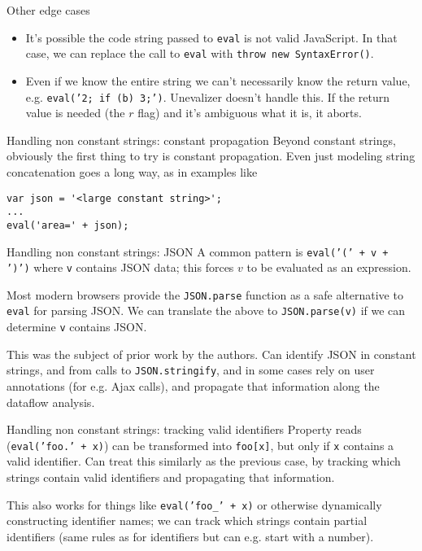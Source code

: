 \documentclass{beamer}
\begin{document}
\begin{frame}{Other edge cases}
\begin{itemize}
\item It's possible the code string passed to {\tt eval} is not valid
JavaScript.  In that case, we can replace the call to {\tt eval} with
{\tt throw new SyntaxError()}.
\item Even if we know the entire string we can't necessarily know the
return value, e.g. {\tt eval('2; if (b) 3;')}. Unevalizer doesn't handle
this. If the return value is needed (the $r$ flag) and it's ambiguous what
it is, it aborts.
\end{itemize}
\end{frame}

\begin{frame}[fragile]{Handling non constant strings: constant propagation}
Beyond constant strings, obviously the first thing to try is constant
propagation. Even just modeling string concatenation goes a long way,
as in examples like

\begin{verbatim}
var json = '<large constant string>';
...
eval('area=' + json);
\end{verbatim}
\end{frame}

\begin{frame}{Handling non constant strings: JSON}
A common pattern is {\tt eval('(' + v + ')')} where {\tt v} contains JSON
data; this forces $v$ to be evaluated as an expression. \vspace{5mm}

Most modern browsers provide the {\tt JSON.parse} function as a safe
alternative to {\tt eval} for parsing JSON. We can translate the above
to {\tt JSON.parse(v)} if we can determine {\tt v} contains JSON.
\vspace{5mm}

This was the subject of prior work by the authors. Can identify JSON in
constant strings, and from calls to {\tt JSON.stringify}, and in some
cases rely on user annotations (for e.g. Ajax calls), and propagate that
information along the dataflow analysis.
\end{frame}

\begin{frame}{Handling non constant strings: tracking valid identifiers}
Property reads ({\tt eval('foo.' + x)}) can be
transformed into {\tt foo[x]}, but only if {\tt x} contains a valid
identifier. Can treat this similarly as the previous case, by tracking
which strings contain valid identifiers and propagating that information.

\vspace{5mm}

This also works for things like {\tt eval('foo\_' + x)} or otherwise
dynamically constructing identifier names; we can track which strings
contain partial identifiers (same rules as for identifiers but can e.g.
start with a number).
\end{frame}
\end{document}
